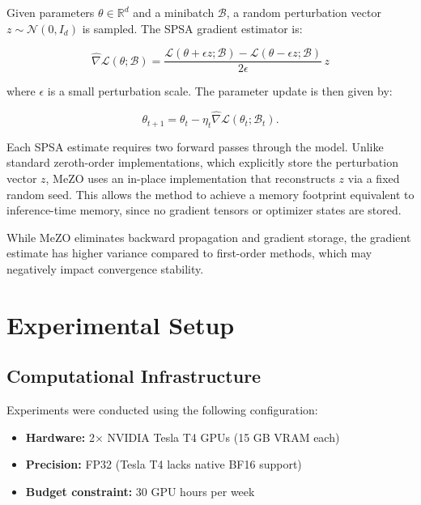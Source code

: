 \documentclass{article}
\begin{document}
Given parameters $\theta \in \mathbb{R}^d$ and a minibatch $\mathcal{B}$, a random perturbation vector $z \sim \mathcal{N}(0, I_d)$ is sampled. The SPSA gradient estimator is:

\begin{equation}
\hat{\nabla}\mathcal{L}(\theta; \mathcal{B}) =
\frac{
\mathcal{L}(\theta + \epsilon z; \mathcal{B})
-
\mathcal{L}(\theta - \epsilon z; \mathcal{B})
}
{2\epsilon}
\, z
\label{eq:spsa}
\end{equation}

where $\epsilon$ is a small perturbation scale. The parameter update is then given by:

\begin{equation}
\theta_{t+1}
=
\theta_t
-
\eta_t
\hat{\nabla}\mathcal{L}(\theta_t; \mathcal{B}_t).
\label{eq:mezo_update}
\end{equation}

Each SPSA estimate requires two forward passes through the model. Unlike standard zeroth-order implementations, which explicitly store the perturbation vector $z$, MeZO uses an in-place implementation that reconstructs $z$ via a fixed random seed. This allows the method to achieve a memory footprint equivalent to inference-time memory, since no gradient tensors or optimizer states are stored.

While MeZO eliminates backward propagation and gradient storage, the gradient estimate has higher variance compared to first-order methods, which may negatively impact convergence stability.

\section{Experimental Setup}

\subsection{Computational Infrastructure}

Experiments were conducted using the following configuration:
\begin{itemize}
    \item \textbf{Hardware:} 2× NVIDIA Tesla T4 GPUs (15 GB VRAM each)
    \item \textbf{Precision:} FP32 (Tesla T4 lacks native BF16 support)
    \item \textbf{Budget constraint:} 30 GPU hours per week
\end{itemize}
\end{document}

